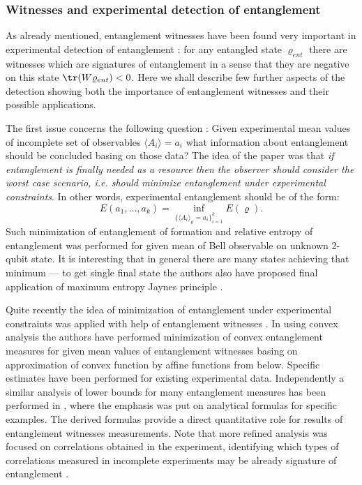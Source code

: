 \documentclass[rmp,12pt,preprint]{revtex4-2}
\begin{document}
\subsubsection{Witnesses and experimental detection of entanglement}
\label{subsec:wit_exp_ent_det}

As already mentioned, entanglement witnesses have been found very
important in experimental detection of entanglement
\cite{sep1996,Terhal2000-laa}: for any entangled state $\varrho_{ent}$
there are witnesses which are signatures of entanglement in a sense
that they are negative on this state ${\tr}(W\varrho_{ent})<0$. Here
we shall describe few further aspects of the detection showing both
the importance of entanglement witnesses and their possible
applications.

The first issue concerns the following question \cite{Jaynes}: Given
experimental mean values of incomplete set of observables $\langle
A_{i} \rangle=a_{i}$ what information about entanglement should be
concluded basing on those data? The idea of the paper was that {\it if
  entanglement is finally needed as a resource then the observer
  should consider the worst case scenario, i.e.  should minimize
  entanglement under experimental constraints}. In other words,
experimental entanglement should be of the form:
\begin{equation}
E(a_{1},\ldots,a_{k})={\inf}_{\{ \langle A_{i}\rangle_\varrho=a_{i}
\}_{i=1}^{k}} E(\varrho).
\end{equation}
Such minimization of entanglement of formation and relative entropy of
entanglement was performed for given mean of Bell observable on
unknown 2-qubit state. It is interesting that in general there are
many states achieving that minimum --- to get single final state the
authors also have proposed final application of maximum entropy Jaynes
principle \cite{Jaynes}.

Quite recently the idea of minimization of entanglement under
experimental constraints was applied with help of entanglement
witnesses \cite{Reimpell,EisertBA}. In \cite{Reimpell} using convex
analysis the authors have performed minimization of convex
entanglement measures for given mean values of entanglement witnesses
basing on approximation of convex function by affine functions from
below. Specific estimates have been performed for existing
experimental data. Independently a similar analysis of lower bounds
for many entanglement measures has been performed in \cite{EisertBA},
where the emphasis was put on analytical formulas for specific
examples. The derived formulas \cite{Reimpell,EisertBA} provide a
direct quantitative role for results of entanglement witnesses
measurements. Note that more refined analysis was focused on
correlations obtained in the experiment, identifying which types of
correlations measured in incomplete experiments may be already
signature of entanglement \cite{PlenioA}.
\end{document}
